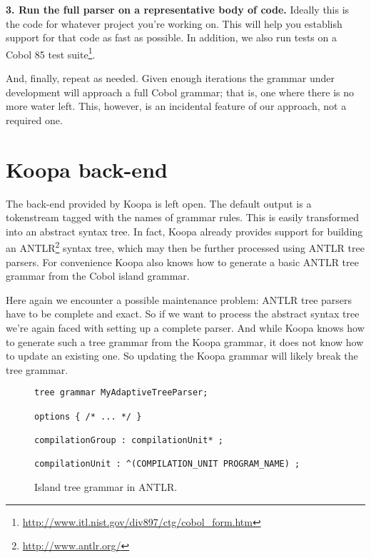 \documentclass[a4paper]{article}
\begin{document}
\textbf{3. Run the full parser on a representative body of code.} Ideally this is the code for whatever project you're working on. This will help you establish support for that code as fast as possible. In addition, we also run tests on a Cobol 85 test suite\footnote{\scriptsize\url{http://www.itl.nist.gov/div897/ctg/cobol_form.htm}}.

And, finally, repeat as needed. Given enough iterations the grammar under development will approach a full Cobol grammar; that is, one where there is no more water left. This, however, is an incidental feature of our approach, not a required one.


\section{Koopa back-end}
\label{backend}

The back-end provided by Koopa is left open. The default output is a tokenstream tagged with the names of grammar rules. This is easily transformed into an abstract syntax tree. In fact, Koopa already provides support for building an ANTLR\footnote{\scriptsize\url{http://www.antlr.org/}} syntax tree, which may then be further processed using ANTLR tree parsers. For convenience Koopa also knows how to generate a basic ANTLR tree grammar from the Cobol island grammar.

Here again we encounter a possible maintenance problem: ANTLR tree parsers have to be complete and exact. So if we want to process the abstract syntax tree we're again faced with setting up a complete parser. And while Koopa knows how to generate such a tree grammar from the Koopa grammar, it does not know how to update an existing one. So updating the Koopa grammar will likely break the tree grammar.

\begin{figure}
\centering
\begin{lstlisting}
tree grammar MyAdaptiveTreeParser;

options { /* ... */ }

compilationGroup : compilationUnit* ;

compilationUnit : ^(COMPILATION_UNIT PROGRAM_NAME) ;
\end{lstlisting}
\caption{Island tree grammar in ANTLR.}
\label{fig:island-tree-grammar}
\end{figure}
\end{document}
